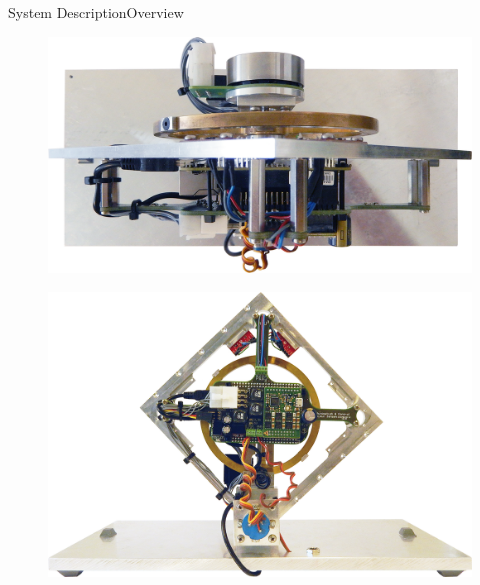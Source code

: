 \begin{frame}{System Description}{Overview}

  \begin{minipage}{\linewidth}
  	\begin{minipage}{0.45\linewidth}
  		\begin{figure}[H]
  			\includegraphics[scale=0.5]{Pictures/Cubli-3.png}
  			\centering
  		\end{figure}
  	\end{minipage}
  	\hspace{0.03\linewidth}
  	\begin{minipage}{0.45\linewidth}
  		\begin{figure}[H]
  			\includegraphics[scale=0.5]{Pictures/Cubli-1.png}
  			\centering
  		\end{figure}
  	\end{minipage}
  \end{minipage}

\end{frame}

